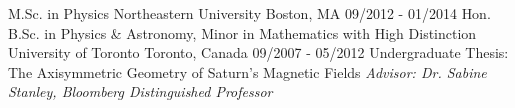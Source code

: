 \begin{cventries}
  \cveducationentry
    {M.Sc. in Physics} %
    {Northeastern University} %
    {Boston, MA} %
    {09/2012 - 01/2014} %
   	{
    }
\vspace{0mm}
  \cveducationentry
    {Hon. B.Sc. in Physics \& Astronomy, Minor in Mathematics with High Distinction} %
    {University of Toronto} %
    {Toronto, Canada} %
    {09/2007 - 05/2012} %
    {Undergraduate Thesis: The Axisymmetric Geometry of Saturn's Magnetic Fields \newline \textit{Advisor: Dr. Sabine Stanley, Bloomberg Distinguished Professor}}
\end{cventries}
